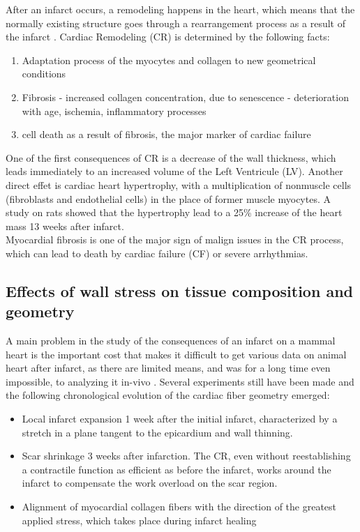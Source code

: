 After an infarct occurs, a remodeling happens in the heart, which means that the normally existing structure goes through a rearrangement process as a result of the infarct \cite{swynghedauw1999molecular}. Cardiac Remodeling (CR) is determined by the following facts:
\begin{enumerate}
    \item Adaptation process of the myocytes and collagen to new geometrical conditions
    \item Fibrosis - increased collagen concentration, due to senescence - deterioration with age, ischemia, inflammatory processes
    \item cell death as a result of fibrosis, the major marker of cardiac failure
\end{enumerate}
One of the first consequences of CR is a decrease of the wall thickness, which leads immediately to an increased volume of the Left Ventricule (LV). Another direct effet is cardiac heart hypertrophy, with a multiplication of nonmuscle cells (fibroblasts and endothelial cells) in the place of former muscle myocytes. A study on rats \cite{mccormick1994regional} showed that the hypertrophy lead to a 25\% increase of the heart mass 13 weeks after infarct.\\
Myocardial fibrosis is one of the major sign of malign issues in the CR process, which can lead to death by cardiac failure (CF) or severe arrhythmias.

\subsection{Effects of wall stress on tissue composition and geometry}

A main problem in the study of the consequences of an infarct on a mammal heart is the important cost that makes it difficult to get various data on animal heart after infarct, as there are limited means,  and was for a long time even impossible, to analyzing it in-vivo \cite{holmes1994scar}. Several experiments still have been made and the following chronological evolution of the cardiac fiber geometry emerged:
\begin{itemize}
    \item Local infarct expansion 1 week after the initial infarct, characterized by a stretch in a plane tangent to the epicardium and wall thinning.
    \item Scar shrinkage 3 weeks after infarction. The CR, even without reestablishing a contractile function as efficient as before the infarct, works around the infarct to compensate the work overload on the scar region.
    \item Alignment of myocardial collagen fibers with the direction of the greatest applied stress, which takes place during infarct healing
\end{itemize}


